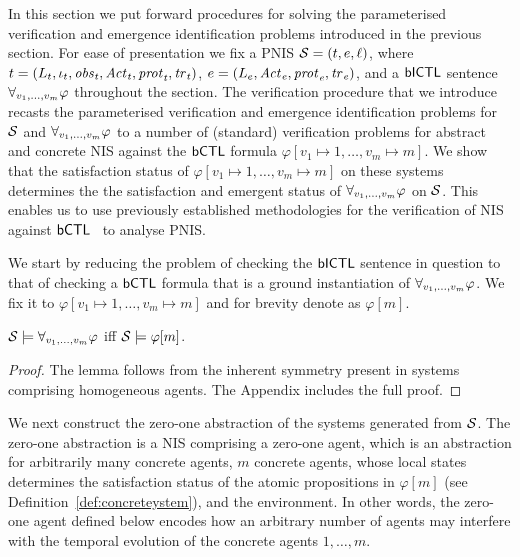 In this section we put forward  procedures for solving the parameterised
verification and emergence identification problems introduced in the previous
section. For ease of presentation we fix a PNIS $\mathcal S = \left ( t, e, \ell \right )$,
where ${t} = \left ( L_{t}, \iota_{t}, \it{obs}_{t}, \it{Act}_{t}, \it{prot}_{t}, \it{tr}_{t}  \right )$,
${e} = \left ( L_{e}, \it{Act}_{e}, \it{prot}_{e}, \it{tr}_{e}  \right )$, and a $\sf{bICTL}$ sentence
$\forall_{v_1,\ldots,v_m} \varphi$ throughout the section. The verification procedure that we
introduce recasts the parameterised verification  and emergence identification
problems for $\mathcal S$ and $\forall_{v_1,\ldots,v_m} \varphi$  to a number of  (standard) verification
problems for  abstract and concrete NIS  against the $\sf{bCTL}$ formula
$\varphi[v_1 \mapsto 1, \ldots, v_m \mapsto m]$.  We show that the satisfaction
status of $\varphi[v_1 \mapsto 1, \ldots, v_m \mapsto m]$ on 
these systems determines the the satisfaction and emergent status of
$\forall_{v_1,\ldots,v_m} \varphi$ on $\mathcal S$. This enables us to use previously established
methodologies for the verification of NIS against $\sf{bCTL}$~\cite{Akintunde+20b}
to analyse PNIS.


We start by reducing the problem of checking the $\sf{bICTL}$ sentence in
question to that of checking a $\sf{bCTL}$ formula that is a ground
instantiation of $\forall_{v_1,\ldots,v_m} \varphi$.  We fix it to
$\varphi[v_1 \mapsto 1, \ldots, v_m \mapsto m]$ and for brevity denote
as $\varphi[m]$.


\begin{lemma}
\label{lemma:symmetry}
$\mathcal S \models \forall_{v_1,\ldots,v_m} \varphi$ iff $\mathcal S \models \varphi[m]$.
\end{lemma}
\begin{proof}
The lemma follows from the inherent symmetry present in systems comprising
homogeneous agents. The Appendix includes the full proof.
\end{proof}

We next construct the zero-one abstraction of the systems generated from
$\mathcal S$. The zero-one abstraction is a NIS comprising a zero-one agent, which is
an abstraction for arbitrarily many concrete agents, $m$ concrete agents, whose
local states determines the satisfaction status of the atomic propositions in
$\varphi[m]$ (see
Definition~\ref{def:concreteystem}), and the environment. In other words, the
zero-one agent defined below encodes how an arbitrary number of agents may
interfere with the temporal evolution of the concrete agents $1, \ldots, m$.

